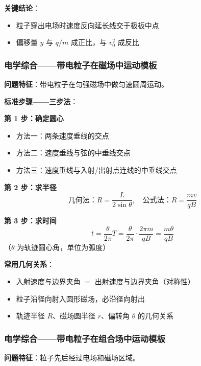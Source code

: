 \textbf{关键结论}：
\begin{itemize}
  \item 粒子穿出电场时速度反向延长线交于极板中点
  \item 偏移量 $y$ 与 $q/m$ 成正比，与 $v_0^2$ 成反比
\end{itemize}

\subsubsection{电学综合——带电粒子在磁场中运动模板}

\textbf{问题特征}：带电粒子在匀强磁场中做匀速圆周运动。

\textbf{标准步骤——三步法}：

\textbf{第 1 步：确定圆心}
\begin{itemize}
  \item 方法一：两条速度垂线的交点
  \item 方法二：速度垂线与弦的中垂线交点
  \item 方法三：速度垂线与入射/出射点连线的中垂线交点
\end{itemize}

\textbf{第 2 步：求半径}
\[
\text{几何法：} R = \frac{L}{2\sin\theta},\quad
\text{公式法：} R = \frac{mv}{qB}
\]

\textbf{第 3 步：求时间}
\[
t = \frac{\theta}{2\pi}T = \frac{\theta}{2\pi}\cdot\frac{2\pi m}{qB} = \frac{m\theta}{qB}
\]
（$\theta$ 为轨迹圆心角，单位为弧度）

\textbf{常用几何关系}：
\begin{itemize}
  \item 入射速度与边界夹角 $=$ 出射速度与边界夹角（对称性）
  \item 粒子沿径向射入圆形磁场，必沿径向射出
  \item 轨迹半径 $R$、磁场圆半径 $r$、偏转角 $\theta$ 的几何关系
\end{itemize}

\subsubsection{电学综合——带电粒子在组合场中运动模板}

\textbf{问题特征}：粒子先后经过电场和磁场区域。

